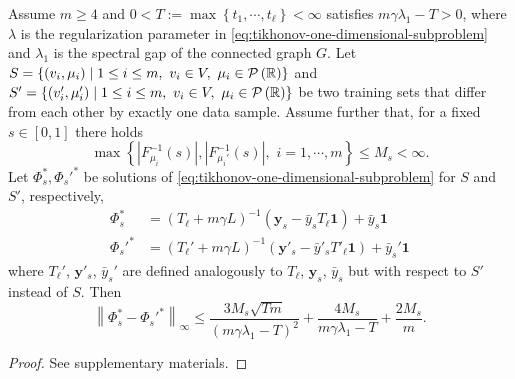 \documentclass[letterpaper]{article} %
\begin{document}
\begin{theorem}
  \label{thm:slice-algorithmic-stability}
  Assume $m\geq 4$ and $0<T:=\max \left\{ t_1,\cdots,t_{\ell} \right\}<\infty$ satisfies $m\gamma\lambda_1-T>0$, where $\lambda$ is the regularization parameter in \eqref{eq:tikhonov-one-dimensional-subproblem} and $\lambda_1$ is the spectral gap of the connected graph $G$. Let $S=\left\{ \left( v_i,\mu_i \right)\mid 1\leq i\leq m,\,\,v_i\in V,\,\,\mu_i\in\P\left( \mathbb{R} \right) \right\}$ and $S'=\left\{ \left( v'_i,\mu'_i \right)\mid 1\leq i\leq m,\,\,v_i\in V,\,\,\mu_i\in\P\left( \mathbb{R} \right) \right\}$ be two training sets that differ from each other by exactly one data sample. Assume further that, for a fixed $s\in \left[ 0,1 \right]$ there holds
  \begin{equation}
    \label{eq:quantile-boundedness}
    \max \left\{ \left|F_{\mu_i}^{-1} \left( s \right)\right|, \left|F_{\mu_i'}^{-1} \left( s \right)\right|,\,\,i=1,\cdots,m\right\}\leq M_s<\infty.
  \end{equation}
  Let $\Phi_s^{*},\Phi_s'^{*}$ be solutions of \eqref{eq:tikhonov-one-dimensional-subproblem} for $S$ and $S'$, respectively,
  \begin{equation*}
    \begin{aligned}
      \Phi_s^{*}&=\left( T_{\ell}+m\gamma L \right)^{-1}\left(\mathbf{y}_s-\bar{y}_sT_\ell\mathbf{1}\right)+\bar{y}_s\mathbf{1}\\
      \Phi_s'^{*}&=\left( T_{\ell}'+m\gamma L \right)^{-1}\left(\mathbf{y}'_s-\bar{y}'_sT'_\ell\mathbf{1}\right)+\bar{y}_s'\mathbf{1}
    \end{aligned}
  \end{equation*}
  where $T_{\ell}'$, $\mathbf{y}'_s$, $\bar{y}_s'$ are defined analogously to $T_{\ell}$, $\mathbf{y}_s$, $\bar{y}_s$ but with respect to $S'$ instead of $S$. Then
  \begin{equation}
    \label{eq:slice-algorithmic-stability}
    \left\| \Phi_s^{*} -\Phi_s'^{*} \right\|_{\infty} \leq \frac{3M_s\sqrt{Tm}}{\left( m\gamma\lambda_1-T \right)^2}+\frac{4M_s}{m\gamma\lambda_1-T}+\frac{2M_s}{m}.
  \end{equation}
\end{theorem}
\begin{proof}
  See supplementary materials.
\end{proof}
\end{document}

